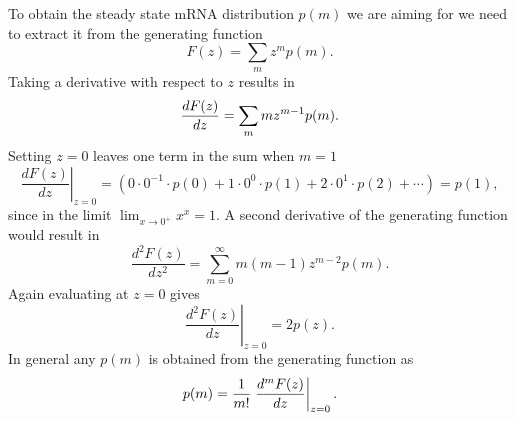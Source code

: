 To obtain the steady state mRNA distribution $p(m)$ we are aiming for we need to
extract it from the generating function
\begin{equation}
F(z) = \sum_m z^m p(m).
\end{equation}
Taking a derivative with respect to $z$ results in
\begin{equation}
{d F(z) \over dz} = \sum_m m z^{m - 1} p(m).
\end{equation}
Setting $z = 0$ leaves one term in the sum when $m = 1$ 
\begin{equation}
\left.\frac{d F(z)}{d z}\right|_{z=0} = 
\left(0 \cdot 0^{-1} \cdot p(0) 
+ 1 \cdot 0^0 \cdot p(1) 
+ 2 \cdot 0^1 \cdot p(2)
+ \cdots \right) = p(1),
\end{equation}
since in the limit $\lim_{x \rightarrow 0^+} x^x = 1$. A second derivative of
the generating function would result in
\begin{equation}
\frac{d^{2} F(z)}{d z^{2}} = \sum_{m=0}^{\infty} m(m-1) z^{m-2} p(m).
\end{equation}
Again evaluating at $z = 0$ gives 
\begin{equation}
\left.\frac{d^{2} F(z)}{d z}\right|_{z=0} = 2 p(z).
\end{equation}
In general any $p(m)$ is obtained from the generating function as
\begin{equation}
p(m) = {1 \over m!} \left. {d^m F(z) \over dz} \right\vert_{z=0}.
\label{eq:prob_from_gen}
\end{equation}

